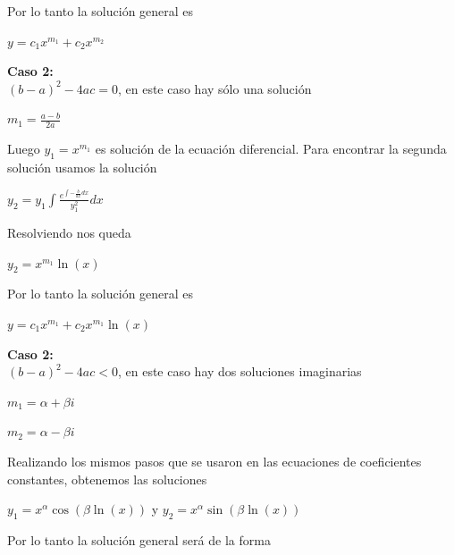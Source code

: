 \documentclass{article}
\theoremstyle{plain}
\theoremstyle{definition}
\begin{document}
Por lo tanto la solución general es

\begin{center}
$y= c_1x^{m_1}+c_2x^{m_2}$
\end{center}

\textbf{Caso 2: } \\


$(b-a)^2-4ac = 0$, en este caso hay sólo una solución



\begin{center}
$\displaystyle m_1 = \frac{a-b}{2a}$
\end{center}


Luego $y_1= x^{m_1}$ es solución de la ecuación diferencial. Para encontrar la segunda solución usamos la solución

\begin{center}
$\displaystyle y_2 = y_1 \int \frac{e^{\int -\frac{b}{ax} dx}}{y_1^2} dx$
\end{center}


Resolviendo nos queda

\begin{center}
$\displaystyle y_2 = x^{m_1}\ln(x)$
\end{center}

Por lo tanto la solución general es

\begin{center}
$y= c_1x^{m_1}+c_2x^{m_1}\ln(x)$
\end{center}


\textbf{Caso 2: } \\


$(b-a)^2-4ac < 0$, en este caso hay dos soluciones imaginarias



\begin{center}
$\displaystyle m_1 = \alpha+ \beta i$
\end{center}

\begin{center}
$\displaystyle m_2 = \alpha - \beta i$
\end{center}


Realizando los mismos pasos que se usaron en las ecuaciones de coeficientes constantes, obtenemos las soluciones

\begin{center}
$y_1 =  x^{\alpha}\cos(\beta \ln(x))$ y  $ y_2 =x^{\alpha}\sin(\beta \ln(x))$
\end{center}


Por lo tanto la solución general será de la forma
\end{document}
